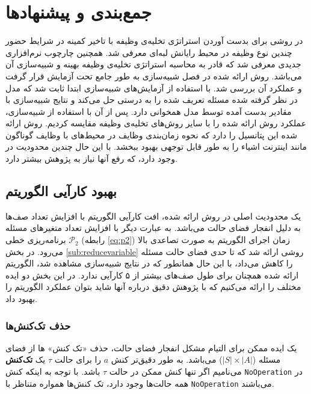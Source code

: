 \chapter{جمع‌بندی و پیشنهاد‌ها}
در \CurrentProject روشی برای بدست آوردن استراتژی تخلیه‌ی وظیفه با تاخیر کمینه در شرایط حضور چندین نوع وظیفه در محیط رایانش لبه‌ای معرفی شد. همچنین چارچوب نرم‌افزاری جدیدی معرفی شد که قادر به محاسبه استراتژی تخلیه‌ی وظیفه بهینه و شبیه‌سازی آن می‌باشد. روش ارائه شده در فصل شبیه‌سازی به طور جامع تحت آزمایش قرار گرفت و عملکرد آن بررسی شد. با استفاده از آزمایش‌های شبیه‌سازی ابتدا ثابت شد که مدل در نظر گرفته شده مسئله تعریف شده را به درستی حل می‌کند و نتایج شبیه‌سازی با مقادیر بدست آمده توسط مدل همخوانی دارد. پس از آن با استفاده از شبیه‌سازی، عملکرد روش ارائه شده را با سایر روش‌های تخلیه‌ی وظیفه مقایسه کردیم. روش ارائه شده این پتانسیل را دارد که نحوه زمان‌بندی وظایف در محیط‌های با وظایف گوناگون مانند اینترنت اشیاء را به طور قابل توجهی بهبود ببخشد. با این حال چندین محدودیت در \CurrentProject وجود دارد، که رفع آنها نیاز به پژوهش بیشتر دارد. 

\section{بهبود کارآیی الگوریتم}
یک محدودیت اصلی در روش ارائه شده، افت کارآیی الگوریتم با افزایش تعداد صف‌ها به دلیل انفجار فضای حالت می‌باشد. به عبارت دیگر با افزایش تعداد متغیرهای مسئله برنامه‌ریزی خطی
$\mathcal{P}_2$
(رابطه \ref{eq:p2}) زمان اجرای الگوریتم به صورت تصاعدی بالا می‌رود. در بخش \ref{sub:reducevariable} روشی ارائه شد که تا حدی فضای حالت مسئله را کاهش می‌داد، با این حال همانطور که در نتایج شبیه‌سازی مشاهده شد، الگوریتم ارائه شده همچنان برای طول صف‌های بیشتر از ۵ کارآیی ندارد. در این بخش دو ایده مختلف را ارائه می‌کنیم که با پژوهش دقیق درباره آنها شاید بتوان عملکرد الگوریتم را بهبود داد.
\subsection{حذف تک‌کنش‌ها}
یک ایده ممکن برای التیام مشکل انفجار فضای حالت، حذف «تک کنش» ها از فضای مسئله ($|S| \times |A|$) می‌باشد. به طور دقیق‌تر کنش $a$ را برای حالت $\tau$ یک \textbf{تک‌کنش} می‌نامیم اگر تنها کنش ممکن در حالت $\tau$ باشد. با توجه به اینکه کنش \texttt{\footnotesize NoOperation} در همه حالت‌ها وجود دارد، تک کنش‌ها همواره متناظر با \texttt{\footnotesize NoOperation} می‌باشند. \\

